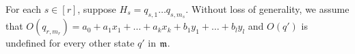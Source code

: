 For each $s\in [r]$, suppose $H_s=q_{s,1} \dots q_{s, m_s}$. Without loss of generality, we assume that $O(q_{r,m_r})=a_0+a_1 x_1 + \dots + a_k x_k + b_1 y_1  + \dots + b_l y_l$ and $O(q')$ is undefined for every other state $q'$ in $\mathfrak{m}$.\smallskip\\
